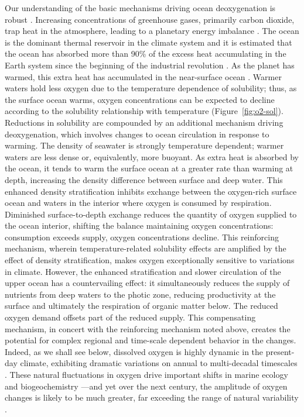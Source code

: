 \documentclass[draft,linenumbers]{report_chapter}
\begin{document}
Our understanding of the basic mechanisms driving ocean deoxygenation is robust \citep{Keeling-Kortzinger-etal-2010,Gruber-2011,Bopp-Quere-etal-2002,Najjar-Keeling-2000,Plattner-Joos-etal-2002,Matear-Hirst-2003}.
Increasing concentrations of greenhouse gases, primarily carbon dioxide, trap heat in the atmosphere, leading to a planetary energy imbalance \citep{Trenberth-Fasullo-etal-2014}.
The ocean is the dominant thermal reservoir in the climate system and it is estimated that the ocean has absorbed more than 90\% of the excess heat accumulating in the Earth system since the beginning of the industrial revolution \citep{Rhein-Rintoul-etal-2013,Loeb-Lyman-etal-2012,Cheng-Trenberth-etal-2016}.
As the planet has warmed, this extra heat has accumulated in the near-surface ocean \citep{Levitus-Antonov-etal-2012,Balmaseda-Trenberth-etal-2013,Abraham-Baringer-etal-2013}.
Warmer waters hold less oxygen due to the temperature dependence of solubility; thus, as the surface ocean warms, oxygen concentrations can be expected to decline according to the solubility relationship with temperature (Figure~\ref{fig:o2-sol}).
Reductions in solubility are compounded by an additional mechanism driving deoxygenation, which involves changes to ocean circulation in response to warming.
The density of seawater is strongly temperature dependent; warmer waters are less dense or, equivalently, more buoyant.
As extra heat is absorbed by the ocean, it tends to warm the surface ocean at a greater rate than warming at depth, increasing the density difference between surface and deep water.
This enhanced density stratification inhibits exchange between the oxygen-rich surface ocean and waters in the interior where oxygen is consumed by respiration.
Diminished surface-to-depth exchange reduces the quantity of oxygen supplied to the ocean interior, shifting the balance maintaining oxygen concentrations: consumption exceeds supply, oxygen concentrations decline.
This reinforcing mechanism, wherein temperature-related solubility effects are amplified by the effect of density stratification, makes oxygen exceptionally sensitive to variations in climate.
However, the enhanced stratification and slower circulation of the upper ocean has a countervailing effect: it simultaneously reduces the supply of nutrients from deep waters to the photic zone, reducing productivity at the surface and ultimately the respiration of organic matter below.
The reduced oxygen demand offsets part of the reduced supply.
This compensating mechanism, in concert with the reinforcing mechanism noted above, creates the potential for complex regional and time-scale dependent behavior in the  changes.
Indeed, as we shall see below, dissolved oxygen is highly dynamic in the present-day climate, exhibiting dramatic variations on annual to multi-decadal timescales \citep{Ito-Deutsch-2010,Deutsch-Brix-etal-2011}.
These natural fluctuations in oxygen drive important shifts in marine ecology and biogeochemistry \citep[e.g.,][]{Rabalais-Diaz-etal-2010,Zamora-Oschlies-etal-2012,Deutsch-Berelson-etal-2014,Yang-Gruber-etal-2016}---and yet over the next century, the amplitude of oxygen changes is likely to be much greater, far exceeding the range of natural variability \citep{Long-Deutsch-etal-2016,Rodgers-Lin-etal-2015,Henson-Beaulieu-etal-2017}.
\end{document}
